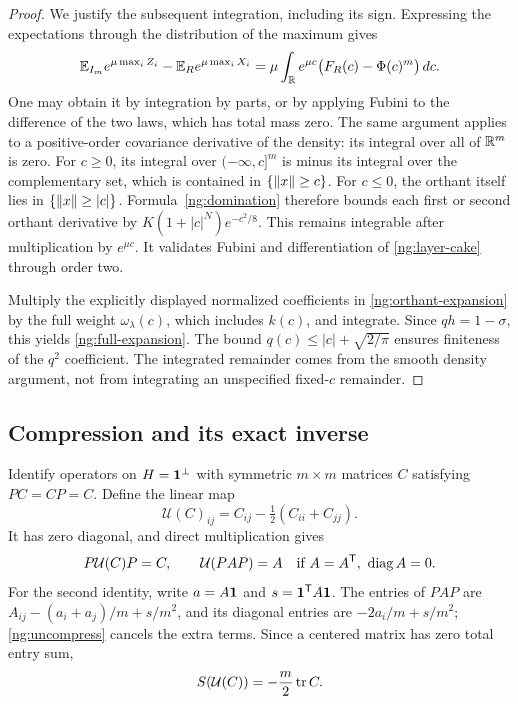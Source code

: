 \begin{proof}
We justify the subsequent integration, including its sign. Expressing
the expectations through the distribution of the maximum gives
\begin{equation}\label{ng:layer-cake}
 \mathbb E_{I_m}e^{\mu\max_i Z_i}-\mathbb E_R e^{\mu\max_i X_i}
   =\mu\int_{\mathbb R}e^{\mu c}\bigl(F_R(c)-\Phi(c)^m\bigr)\,dc.
\end{equation}
One may obtain it by integration by parts, or by applying Fubini to the
difference of the two laws, which has total mass zero. The same argument
applies to a positive-order covariance derivative of the density:
its integral over all of $\mathbb R^m$ is zero. For $c\ge0$, its integral over
$(-\infty,c]^m$ is minus its integral over the complementary set, which is
contained in $\{\left\lVert x\right\rVert\ge c\}$. For $c\le0$, the orthant itself lies in
$\{\left\lVert x\right\rVert\ge|c|\}$. Formula~\eqref{ng:domination} therefore bounds each
first or second orthant derivative by
$K(1+|c|^N)e^{-c^2/8}$. This remains integrable after multiplication by
$e^{\mu c}$. It validates Fubini and differentiation of
\eqref{ng:layer-cake} through order two.

Multiply the explicitly displayed normalized coefficients in
\eqref{ng:orthant-expansion} by the full weight $\omega_\lambda(c)$,
which includes $k(c)$, and integrate. Since $qh=1-\sigma$, this yields
\eqref{ng:full-expansion}. The bound
$q(c)\le |c|+\sqrt{2/\pi}$ ensures finiteness of the $q^2$ coefficient.
The integrated remainder comes from the smooth density argument, not
from integrating an unspecified fixed-$c$ remainder.
\end{proof}

\subsection{Compression and its exact inverse}\label{ng:compression}

Identify operators on $H=\mathbf 1^\perp$ with symmetric $m\times m$ matrices
$C$ satisfying $PC=CP=C$. Define the linear map
\begin{equation}\label{ng:uncompress}
 \mathcal U(C)_{ij}=C_{ij}-\tfrac12(C_{ii}+C_{jj}).
\end{equation}
It has zero diagonal, and direct multiplication gives
\begin{equation}\label{ng:inverse}
 P\mathcal U(C)P=C,\qquad
 \mathcal U(PAP)=A
 \quad\text{if }A=A^{\mathsf T},\ \operatorname{diag} A=0.
\end{equation}
For the second identity, write $a=A\mathbf 1$ and
$s=\mathbf 1^{\mathsf T}A\mathbf 1$. The entries of $PAP$ are
$A_{ij}-(a_i+a_j)/m+s/m^2$, and its diagonal entries are
$-2a_i/m+s/m^2$; \eqref{ng:uncompress} cancels the extra terms.
Since a centered matrix has zero total entry sum,
\begin{equation}\label{ng:trace-sum}
 S(\mathcal U(C))=-\frac m2\operatorname{tr} C.
\end{equation}

